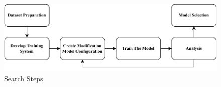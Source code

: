 \begin{figure}
  \centering
  \small
  \includegraphics[width=.9\textwidth]{figures/methods.pdf}
  \caption{Search Steps}
  \label{fig:methods}
\end{figure}
\vspace{-1ex}





